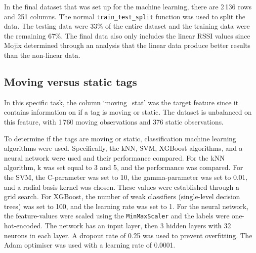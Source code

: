 \documentclass{article}
\begin{document}
In the final dataset that was set up for the machine learning, there are 2\,136 rows and 251 columns.
The normal \texttt{train\_test\_split} function was used to split the data.
The testing data were 33\% of the entire dataset and the training data were the remaining 67\%.
The final data also only includes the linear \ac{RSSI} values since Mojix determined through an analysis that the linear data produce better results than the non-linear data.

\subsection{Moving versus static tags}

In this specific task, the column `moving\_stat' was the target feature since it contains information on if a tag is moving or static.
The dataset is unbalanced on this feature, with 1\,760 moving observations and 376 static observations.

To determine if the tags are moving or static, classification machine learning algorithms were used.
Specifically, the \ac{kNN}, \ac{SVM}, XGBoost algorithms, and a neural network were used and their performance compared.
For the \ac{kNN} algorithm, k was set equal to 3 and 5, and the performance was compared.
For the \ac{SVM}, the C-parameter was set to 10, the gamma-parameter was set to 0.01, and a radial basis kernel was chosen.
These values were established through a grid search.
For XGBoost, the number of weak classifiers (single-level decision trees) was set to 100, and the learning rate was set to 1.
For the neural network, the feature-values were scaled using the \texttt{MinMaxScaler} and the labels were one-hot-encoded.
The network has an input layer, then 3 hidden layers with 32 neurons in each layer. 
A dropout rate of 0.25 was used to prevent overfitting.
The Adam optimiser was used with a learning rate of 0.0001.
\end{document}
